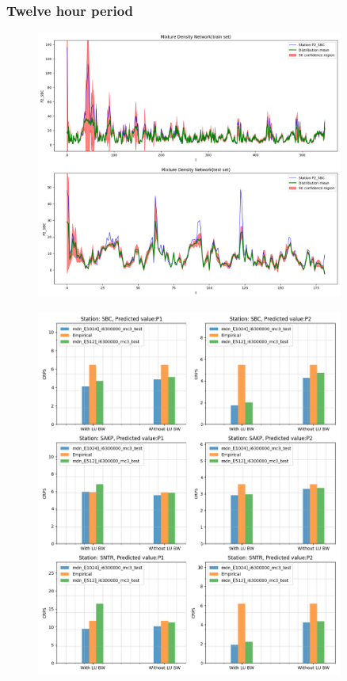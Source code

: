 \documentclass[12pt,a4paper,twoside]{scrartcl}
\numberwithin{equation}{section}
\begin{document}
\subsubsection{Twelve hour period}

\begin{center}
  \begin{figure}[htbp]
    \centering
    \includegraphics[height=0.75\textwidth, width=0.9\textwidth]{figures/mdn_12h}
    \caption[MDN twelve hours plot]{}\label{fig:mdn-12h-plot}
  \end{figure}
\end{center}

\begin{center}
  \begin{figure}[htbp]
    \centering
    \includegraphics[height=0.75\textwidth, width=0.9\textwidth]{figures/results_plot_CRPS_12h}
    \caption[CRPS twelve hours results]{}\label{fig:crps-12h}
  \end{figure}
\end{center}
\end{document}
